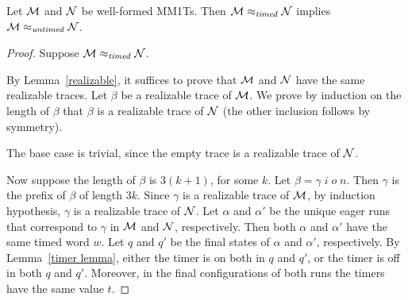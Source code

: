 \begin{theorem}
Let ${\cal M}$ and ${\cal N}$ be well-formed MM1Ts.
Then  ${\cal M} \approx_{\mathit{timed}} {\cal N}$ implies ${\cal M} \approx_{\mathit{untimed}} {\cal N}$.
\end{theorem}
\begin{proof}
Suppose ${\cal M} \approx_{\mathit{timed}} {\cal N}$. 

By Lemma~\ref{realizable}, it suffices to prove that ${\cal M}$ and ${\cal N}$ have the same realizable traces.
Let $\beta$ be a realizable trace of ${\cal M}$.
We prove by induction on the length of $\beta$ that $\beta$ is a realizable trace of ${\cal N}$ (the other inclusion follows by symmetry).

The base case is trivial, since the empty trace is a realizable trace of ${\cal N}$.

Now suppose the length of $\beta$ is $3(k+1)$, for some $k$.
Let $\beta = \gamma \; i \; o \; n$.
Then $\gamma$ is the prefix of $\beta$ of length $3 k$.
Since $\gamma$ is a realizable trace of ${\cal M}$, by induction hypothesis, $\gamma$ is a realizable trace of ${\cal N}$.
Let $\alpha$ and $\alpha'$ be the unique eager runs that correspond to $\gamma$ in ${\cal M}$ and ${\cal N}$, respectively.
Then both $\alpha$ and $\alpha'$ have the same timed word $w$. 
Let $q$ and $q'$ be the final states of $\alpha$ and $\alpha'$, respectively.
By Lemma~\ref{timer lemma}, either the timer is on both in $q$ and $q'$, or the timer is off in both $q$ and $q'$.
Moreover, in the final configurations of both runs the timers have the same value $t$.


\end{proof}
